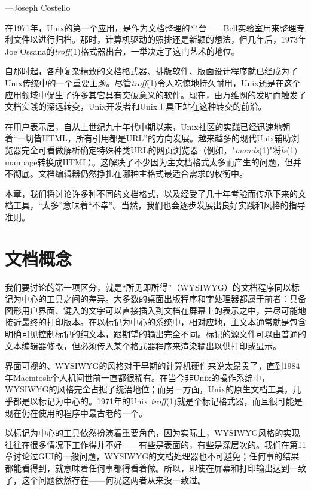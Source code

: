 \documentclass[12pt,oneside]{book}
\begin{document}
\begin{common-format}
\begin{flushright}
\begin{notecard}{28em}
{\hfill —Joseph Costello }
\end{notecard}
\end{flushright}

在1971年，Unix的第一个应用，是作为文档整理的平台——Bell实验室用来整理专利文件以进行归档。那时，计算机驱动的照排还是新颖的想法，但几年后，1973年Joe Ossana的\textit{troff}(1)格式器出台，一举决定了这门艺术的地位。

自那时起，各种复杂精致的文档格式器、排版软件、版面设计程序就已经成为了Unix传统中的一个重要主题。尽管\textit{troff}(1)令人吃惊地持久耐用，Unix还是在这个应用领域中促生了许多其它具有突破意义的软件。现在，由万维网的发明而触发了文档实践的深远转变，Unix开发者和Unix工具正站在这种转交的前沿。

在用户表示层，自从上世纪九十年代中期以来，Unix社区的实践已经迅速地朝着“一切皆HTML，所有引用都是URL”的方向发展。越来越多的现代Unix辅助浏览器完全可看做解析确定特殊种类URL的网页浏览器（例如，"\textit{man:ls}(1)"将\textit{ls}(1) manpage转换成HTML）。这解决了不少因为主文档格式太多而产生的问题，但并不彻底。文档编辑器仍然挣扎在哪种主格式最适合需求的权衡中。

本章，我们将讨论许多种不同的文档格式，以及经受了几十年考验而传承下来的文档工具，“太多”意味着“不幸”。当然，我们也会逐步发展出良好实践和风格的指导准则。

\section{文档概念}
我们要讨论的第一项区分，就是“所见即所得”（WYSIWYG）的文档程序同以标记为中心的工具之间的差异。大多数的桌面出版程序和字处理器都属于前者：具备图形用户界面、键入的文字可以直接插入到文档在屏幕上的表示之中，并尽可能地接近最终的打印版本。在以标记为中心的系统中，相对应地，主文本通常就是包含明确可见控制标记的纯文本，跟期望的输出完全不同。标记的源文件可以由普通的文本编辑器修改，但必须传入某个格式器程序来渲染输出以供打印或显示。

界面可视的、WYSIWYG的风格对于早期的计算机硬件来说太昂贵了，直到1984年Macintosh个人机问世前一直都很稀有。在当今非Unix的操作系统中，WYSIWYG的风格完全占据了统治地位；而另一方面，Unix的原生文档工具，几乎都是以标记为中心的。1971年的Unix \textit{troff}(1)就是个标记格式器，而且很可能是现在仍在使用的程序中最古老的一个。

以标记为中心的工具依然扮演着重要角色，因为实际上，WYSIWYG风格的实现往往在很多情况下工作得并不好——有些是表面的，有些是深层次的。我们在第11章讨论过GUI的一般问题，WYSIWYG的文档处理器也不可避免；任何事的结果都能看得到，就意味着任何事都得看着做。所以，即使在屏幕和打印输出达到一致了，这个问题依然存在——何况这两者从来没一致过。


\end{common-format}
\end{document}
